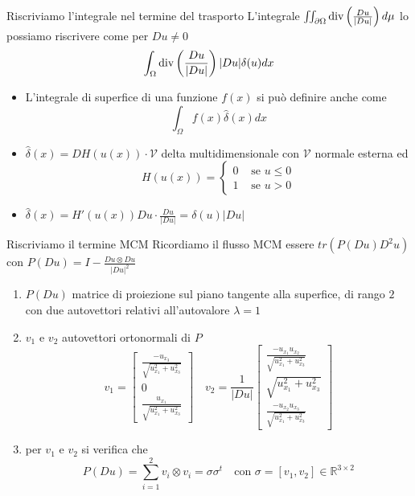 \begin{frame}{Riscriviamo l'integrale nel termine del trasporto}
     L'integrale
    $\iint_{\partial\Omega}\operatorname{div}\left(\frac{Du}{|Du|}\right)d\mu$ lo
    possiamo riscrivere come per $Du\neq 0$
    \[
    \int_{\Omega}\operatorname{div}\left(\frac{Du}{|Du|}\right)|Du|\delta(u)dx
    \]
    \begin{itemize}
    \item L'integrale di superfice di una funzione $f(x)$ si può
      definire anche come 
      \[
      \int_{\Omega}f(x)\hat{\delta}(x)dx
      \]   
    \item $\hat{\delta}(x)=DH(u(x))\cdot\mathcal{V}$ delta
      multidimensionale con $\mathcal{V}$ normale esterna ed 
      \[
      H(u(x))=
      \begin{cases}
        0 &\text{ se }u\leq 0 \\
        1 &\text{ se }u > 0
      \end{cases}
      \]
    \item $\hat{\delta}(x)=H'(u(x))Du\cdot\frac{Du}{|Du|}=\delta(u)|Du|$
    \end{itemize}
 \end{frame}

\begin{frame}{Riscriviamo il termine MCM}
  Ricordiamo il flusso MCM essere $tr(P(Du)D^2u)$ con
  $P(Du)=I-\frac{Du\otimes Du}{|Du|^2}$
  \begin{enumerate}
    \item $P(Du)$ matrice di proiezione sul piano tangente alla
      superfice, di rango $2$ con due autovettori relativi
      all'autovalore $\lambda=1$ 
    \item  $v_1$ e $v_2$ autovettori ortonormali di $P$ 
      \[
      v_1=
      \begin{bmatrix}
        \frac{-u_{x_3}}{\sqrt{u_{x_1}^2+u_{x_3}^2}} \\
        0 \\
        \frac{u_{x_1}}{\sqrt{u_{x_1}^2+u_{x_3}^2}}
      \end{bmatrix}
      \quad
      v_2=\frac{1}{|Du|}
      \begin{bmatrix}
        \frac{-u_{x_1}u_{x_2}}{\sqrt{u_{x_1}^2+u_{x_3}^2}} \\
        \sqrt{u_{x_1}^2+u_{x_3}^2} \\
        \frac{-u_{x_2}u_{x_3}}{\sqrt{u_{x_1}^2+u_{x_3}^2}}
      \end{bmatrix}
      \]
    \item per $v_1$ e $v_2$ si verifica che 
    \[
    P(Du)=\sum_{i=1}^2v_i\otimes v_i=\sigma\sigma^t\quad\text{con }
    \sigma=[v_1,v_2]\in\mathbb{R}^{3\times 2} 
    \]
  \end{enumerate}
\end{frame}

